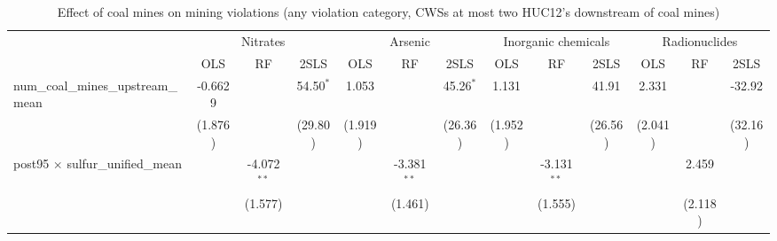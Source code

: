 
\begin{table}[htbp]
   
   \caption{\label{2sls_dwnstrm2step_minevio_allcat} Effect of coal mines on mining violations (any violation category, CWSs at most two HUC12's downstream of coal mines)}
   \bigskip
   
   \centering
   
   \begin{adjustbox}{width = \textwidth, center}
      
      
      \begin{tabular}{lcccccccccccc}
         \toprule
         
          & \multicolumn{3}{c}{Nitrates} & \multicolumn{3}{c}{Arsenic} & \multicolumn{3}{c}{Inorganic chemicals} & \multicolumn{3}{c}{Radionuclides}\\
         
                                                                             & OLS           & RF            & 2SLS          & OLS           & RF            & 2SLS          & OLS           & RF            & 2SLS          & OLS           & RF            & 2SLS\\  
         
         \midrule 
         num\_coal\_mines\_upstream\_mean                                    & -0.6629       &               & 54.50$^{*}$   & 1.053         &               & 45.26$^{*}$   & 1.131         &               & 41.91         & 2.331         &               & -32.92\\   
                                                                             & (1.876)       &               & (29.80)       & (1.919)       &               & (26.36)       & (1.952)       &               & (26.56)       & (2.041)       &               & (32.16)\\   
         post95 $\times$ sulfur\_unified\_mean                               &               & -4.072$^{**}$ &               &               & -3.381$^{**}$ &               &               & -3.131$^{**}$ &               &               & 2.459         &   \\   
                                                                             &               & (1.577)       &               &               & (1.461)       &               &               & (1.555)       &               &               & (2.118)       &   \\   
         

\end{tabular}
\end{adjustbox}
\end{table}
